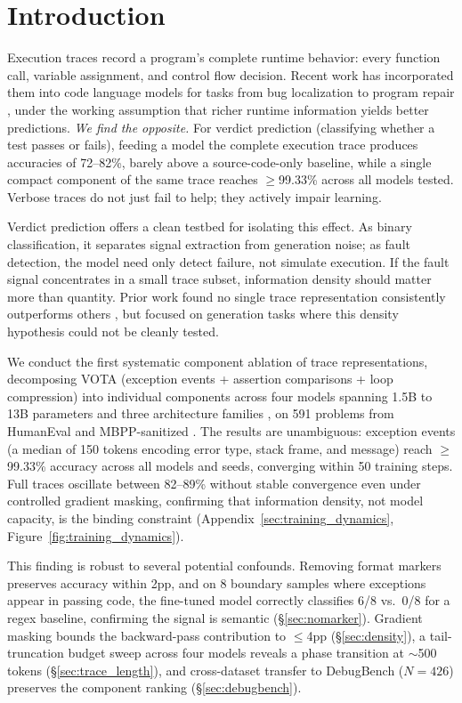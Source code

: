 \section{Introduction}

Execution traces record a program's complete runtime behavior: every function call, variable assignment, and control flow decision.
Recent work has incorporated them into code language models for tasks from bug localization to program repair \citep{chen2025tracepile,ding2024traced,wang2025dcsh,ni2024next}, under the working assumption that richer runtime information yields better predictions.
\emph{We find the opposite.}
For verdict prediction (classifying whether a test passes or fails), feeding a model the complete execution trace produces accuracies of 72--82\%, barely above a source-code-only baseline, while a single compact component of the same trace reaches ${\geq}$99.33\% across all models tested.
Verbose traces do not just fail to help; they actively impair learning.

Verdict prediction offers a clean testbed for isolating this effect.
As binary classification, it separates signal extraction from generation noise; as fault detection, the model need only detect failure, not simulate execution.
If the fault signal concentrates in a small trace subset, information density should matter more than quantity.
Prior work found no single trace representation consistently outperforms others \citep{wang2025dcsh}, but focused on generation tasks where this density hypothesis could not be cleanly tested.

We conduct the first systematic component ablation of trace representations, decomposing VOTA (exception events + assertion comparisons + loop compression) into individual components across four models spanning 1.5B to 13B parameters and three architecture families \citep{qwen2025coder,roziere2024code,deepseek2024coder}, on 591 problems from HumanEval \citep{chen2021evaluating} and MBPP-sanitized \citep{austin2021program}.
The results are unambiguous: exception events (a median of 150 tokens encoding error type, stack frame, and message) reach ${\geq}$99.33\% accuracy across all models and seeds, converging within 50 training steps.
Full traces oscillate between 82--89\% without stable convergence even under controlled gradient masking, confirming that information density, not model capacity, is the binding constraint (Appendix~\ref{sec:training_dynamics}, Figure~\ref{fig:training_dynamics}).

This finding is robust to several potential confounds.
Removing format markers preserves accuracy within 2pp, and on 8 boundary samples where exceptions appear in passing code, the fine-tuned model correctly classifies 6/8 vs.\ 0/8 for a regex baseline, confirming the signal is semantic (\S\ref{sec:nomarker}).
Gradient masking bounds the backward-pass contribution to ${\leq}$4pp (\S\ref{sec:density}), a tail-truncation budget sweep across four models reveals a phase transition at ${\sim}$500 tokens (\S\ref{sec:trace_length}), and cross-dataset transfer to DebugBench ($N{=}426$) preserves the component ranking (\S\ref{sec:debugbench}).

